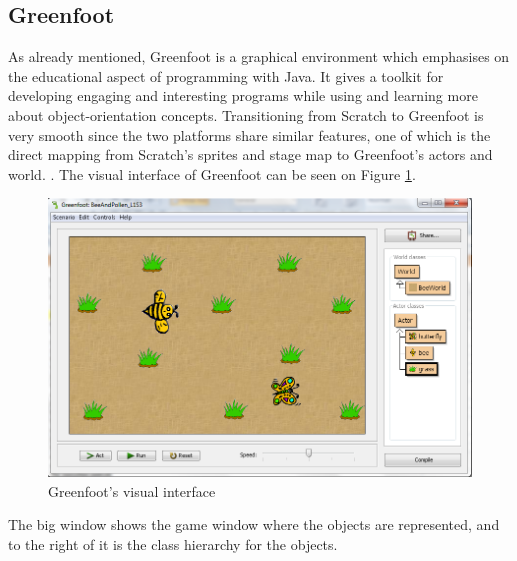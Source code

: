 \subsection{Greenfoot}
As already mentioned, Greenfoot is a graphical environment which emphasises on the educational aspect of programming with Java. It gives a toolkit for developing engaging and interesting programs while using and learning more about object-orientation concepts. Transitioning from Scratch to Greenfoot is very smooth since the two platforms share similar features, one of which is the direct mapping from Scratch's sprites and stage map to Greenfoot's actors and world. \cite{MaloneyResnick10}. The visual interface of Greenfoot can be seen on Figure \ref{fig:grenfoot_environment}.
\begin{figure}[H]
\begin{center}
\includegraphics[scale=0.37]{./pics/greenfoot.png}
\caption{Greenfoot's visual interface\protect\footnotemark}
\label{fig:grenfoot_environment}
\end{center}
\end{figure}


The big window shows the game window where the objects are represented, and to the right of it is the class hierarchy for the objects.
